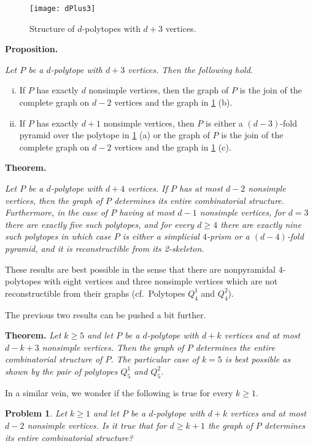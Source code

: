 \documentclass[a4paper]{amsart}
\newtheorem{problem}[theorem]{Problem}
\theoremstyle{definition}
\theoremstyle{remark}
\begin{document}
\begin{figure}
\begin{center}
\texttt{[image: dPlus3]}
\end{center}
\caption{Structure of $d$-polytopes with $d+3$ vertices.}
\label{fig:dPlus3}
\end{figure}

{\bf Proposition.} {\it Let $P$ be a $d$-polytope with $d+3$ vertices. Then the following hold.
\begin{enumerate}[(i)]
\item If $P$ has exactly $d$ nonsimple vertices, then the graph of $P$ is the join of the complete graph on $d-2$ vertices and the graph in \cref{fig:dPlus3} (b). 

\item If $P$ has exactly $d+1$ nonsimple vertices, then $P$ is either a $(d-3)$-fold pyramid over the polytope in \cref{fig:dPlus3} (a) or the graph of $P$ is the join of the complete graph on $d-2$ vertices and the graph in \cref{fig:dPlus3} (c).
\end{enumerate}}

{\bf Theorem.} {\it Let $P$ be a $d$-polytope with $d+4$ vertices. If  $P$ has at most $d-2$ nonsimple vertices, then the graph of $P$ determines its entire combinatorial structure. Furthermore, in the case of $P$ having at most $d-1$ nonsimple vertices, for $d=3$ there are exactly five such polytopes, and for every $d\ge4$ there are exactly nine such polytopes in which case $P$ is either a simplicial $4$-prism or a $(d-4)$-fold pyramid, and it is reconstructible from its 2-skeleton. 

These results are best possible in the sense that there are  nonpyramidal $4$-polytopes with eight vertices and three nonsimple vertices which are not reconstructible from their graphs  (cf.~Polytopes $Q^1_4$ and $Q^2_4$).}

The previous two results can be pushed a bit further. 

{\bf Theorem.} {\it  Let $k\ge 5$ and let $P$ be a $d$-polytope with $d+k$ vertices and  at most $d-k+3$ nonsimple vertices. Then the graph of $P$ determines the entire combinatorial structure of $P$. The particular case of $k=5$ is best possible as shown by the pair of polytopes $Q^1_5$  and $Q^2_5$.}

In a similar vein, we wonder if the following is true for every $k\ge 1$. 

\begin{problem}\label{prob:smallVertRec} Let $k\ge 1$ and let $P$ be a $d$-polytope with $d+k$ vertices and  at most $d-2$ nonsimple vertices. Is it true that for $d\ge k+1$  the graph of $P$ determines its entire combinatorial structure? \end{problem}
\end{document}

